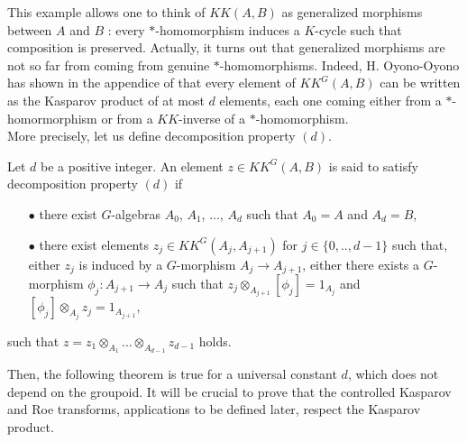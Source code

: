 
This example allows one to think of $KK(A,B)$ as generalized morphisms between $A$ and $B$ : every $*$-homomorphism induces a $K$-cycle such that composition is preserved. Actually, it turns out that generalized morphisms are not so far from coming from genuine $*$-homomorphisms. Indeed, H. Oyono-Oyono has shown in the appendice of \cite{LaffOY} that every element of $KK^G(A,B)$ can be written as the Kasparov product of at most $d$ elements, each one coming either from a $*$-homormorphism or from a $KK$-inverse of a $*$-homomorphism.\\


More precisely, let us define decomposition property $(d)$.

\begin{definition}\label{DecompositionPropertyD}
Let $d$ be a positive integer. An element $z\in KK^G(A,B)$ is said to satisfy decomposition property $(d)$ if
\begin{itemize}
\item[$\bullet$] there exist $G$-algebras $A_0$, $A_1$, ..., $A_d$ such that $A_0=A$ and $A_d=B$, 
\item[$\bullet$] there exist elements $z_j \in KK^G(A_{j},A_{j+1})$ for $j\in\{0,..,d-1\}$ such that, either $z_j$ is induced by a $G$-morphism $A_j \rightarrow A_{j+1}$, either there exists a $G$-morphism $\phi_j : A_{j+1}\rightarrow A_j$ such that $z_j \otimes_{A_{j+1}} [\phi_j] = 1_{A_j}$ and $ [\phi_j] \otimes_{A_{j}} z_j  = 1_{A_{j+1}}$,
\end{itemize}
such that $z = z_1 \otimes_{A_1}  ... \otimes_{A_{d-1}} z_{d-1} $ holds.
\end{definition}

Then, the following theorem is true for a universal constant $d$, which does not depend on the groupoid. It will be crucial to prove that the controlled Kasparov and Roe transforms, applications to be defined later, respect the Kasparov product. 

